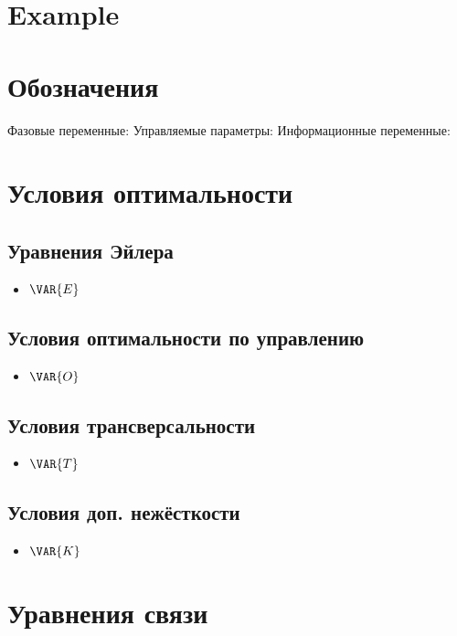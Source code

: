 \documentclass{article}
\begin{document}
\section{Example}


\section{Обозначения}

Фазовые переменные: 
Управляемые параметры: 
Информационные переменные: 

\section{Условия оптимальности}
\subsection{Уравнения Эйлера}
\begin{itemize}
    \item $\VAR{E}$
\end{itemize}

\subsection{Условия оптимальности по управлению}
\begin{itemize}
    \item $\VAR{O}$
\end{itemize}

\subsection{Условия трансверсальности}
\begin{itemize}
    \item $\VAR{T}$
\end{itemize}

\subsection{Условия доп. нежёсткости}
\begin{itemize}
    \item $\VAR{K}$
\end{itemize}

\section{Уравнения связи}
\end{document}
